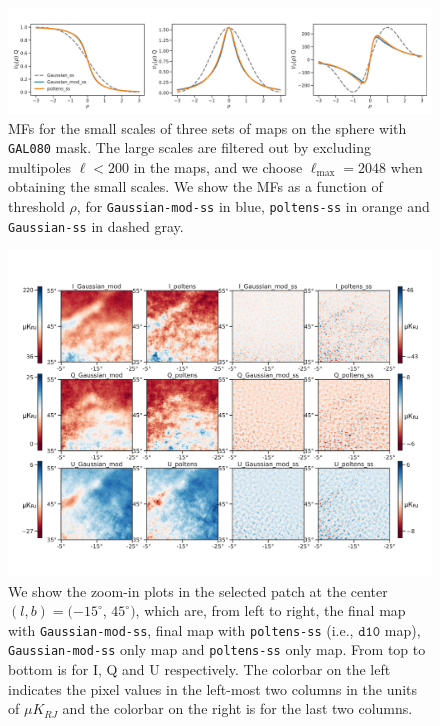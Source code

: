 \documentclass[twocolumn]{aastex631}
\begin{document}
\begin{figure}
    \centering
    \includegraphics[width=180mm]{figures/MFs_80p_sky_Q.pdf}
    \caption{MFs for the small scales of three sets of maps on the sphere with \texttt{GAL080} mask. The large scales are filtered out by excluding multipoles $\ell < 200$ in the maps, and we choose $\ell_\text{max} = 2048$ when obtaining the small scales. We show the MFs as a function of threshold $\rho$, for \texttt{Gaussian-mod-ss} in blue, \texttt{poltens-ss} in orange and \texttt{Gaussian-ss} in dashed gray.}
    \label{fig:MF:sphere}
\end{figure}

\begin{figure}
    \centering
    \includegraphics[width=180mm]{figures/maps_patch_345_45.pdf}
    \caption{We show the zoom-in plots in the selected patch at the center $(l, b) = (-15^{\circ}$, $45^{\circ})$, which are, from left to right, the final map with \texttt{Gaussian-mod-ss}, final map with \texttt{poltens-ss} (i.e., $\texttt{d10}$ map), \texttt{Gaussian-mod-ss} only map and \texttt{poltens-ss} only map. From top to bottom is for I, Q and U respectively. The colorbar on the left indicates the pixel values in the left-most two columns in the units of $\mu K_{RJ}$ and the colorbar on the right is for the last two columns. }
    \label{fig:maps:patch2}
\end{figure}
\end{document}
